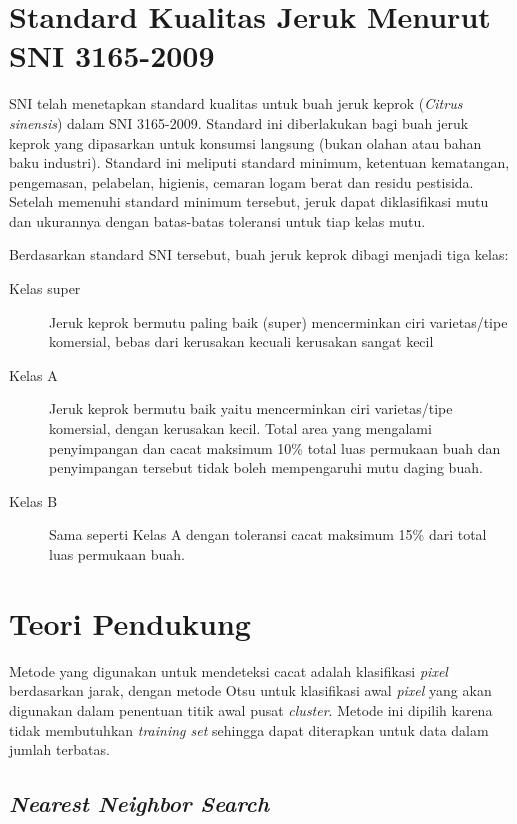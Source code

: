 \documentclass[laporan.tex]{subfiles}
\begin{document}
\FloatBarrier

\section{Standard Kualitas Jeruk Menurut SNI 3165-2009}

SNI telah menetapkan standard kualitas untuk buah jeruk keprok (\emph{Citrus sinensis}) dalam SNI 3165-2009. Standard ini diberlakukan bagi buah jeruk keprok yang dipasarkan untuk konsumsi langsung (bukan olahan atau bahan baku industri). Standard ini meliputi standard minimum, ketentuan kematangan, pengemasan, pelabelan, higienis, cemaran logam berat dan residu pestisida. Setelah memenuhi standard minimum tersebut, jeruk dapat diklasifikasi mutu dan ukurannya dengan batas-batas toleransi untuk tiap kelas mutu.\cite{sni}

Berdasarkan standard SNI tersebut, buah jeruk keprok dibagi menjadi tiga kelas:

\begin{description}
\item [Kelas super] Jeruk keprok bermutu paling baik (super) mencerminkan ciri varietas/tipe komersial, bebas dari kerusakan kecuali kerusakan sangat kecil
\item [Kelas A] Jeruk keprok bermutu baik yaitu mencerminkan ciri varietas/tipe komersial, dengan kerusakan kecil. Total area yang mengalami penyimpangan dan cacat maksimum 10\% total luas permukaan buah dan penyimpangan tersebut tidak boleh mempengaruhi mutu daging buah.
\item [Kelas B] Sama seperti Kelas A dengan toleransi cacat maksimum 15\% dari total luas permukaan buah.
\end{description}

\section{Teori Pendukung}

Metode yang digunakan untuk mendeteksi cacat adalah klasifikasi \emph{pixel} berdasarkan jarak, dengan metode Otsu untuk klasifikasi awal \emph{pixel} yang akan digunakan dalam penentuan titik awal pusat \emph{cluster}. Metode ini dipilih karena tidak membutuhkan \emph{training set} sehingga dapat diterapkan untuk data dalam jumlah terbatas.

\subsection{\emph{Nearest Neighbor Search}}
\end{document}
